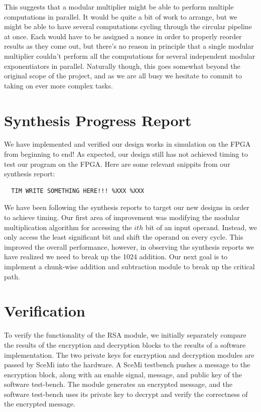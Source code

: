 \documentclass[12pt]{article}
\begin{document}
This suggests that a modular multiplier might be able to perform multiple computations in parallel.
It would be quite a bit of work to arrange,
but we might be able to have several computations cycling through the circular pipeline at once.
Each would have to be assigned a nonce in order to properly reorder results as they come out,
but there's no reason in principle that a single modular multiplier couldn't perform all the computations
for several independent modular exponentiators in parallel.
Naturally though, this goes somewhat beyond the original scope of the project,
and as we are all busy we hesitate to commit to taking on ever more complex tasks.
\section{Synthesis Progress Report}
We have implemented and verified our design works in simulation on the FPGA from beginning to end!  As expected, our design still has not achieved timing to test our program on the FPGA.  Here are some relevant snippits from our synthesis report: \
\begin{verbatim}
  TIM WRITE SOMETHING HERE!!! %XXX %XXX
\end{verbatim}

We have been following the synthesis reports to target our new designs in order to achieve timing.  Our first area of improvement was modifying the modular multiplication algorithm for accessing the $ith$ bit of an input operand. Instead, we only access the least significant bit and shift the operand on every cycle. This improved the overall performance, however, in observing the synthesis reports we have realized we need to break up the 1024 addition.  
Our next goal is to implement a chunk-wise addition and subtraction module to break up the critical path.
\section{Verification}
To verify the functionality of the RSA module, we initially separately 
compare the results of the encryption and decryption blocks to the results
of a software implementation. The two private keys for encryption and
decryption modules are passed by SceMi into the hardware. A SceMi testbench
pushes a message to the encryption block, along with an enable signal, message,
and public key of the software test-bench. The module generates an encrypted message,
and the software test-bench uses its private key to decrypt and verify the 
correctness of the encrypted message.
\end{document}
